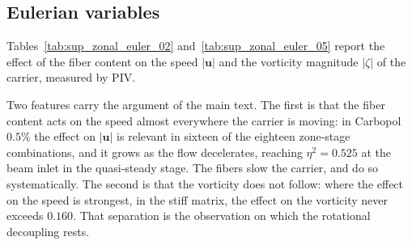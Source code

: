\documentclass[%
  aip,
  pof,
  reprint,
  floatfix
]{revtex4-2}
\begin{document}
\subsection{Eulerian variables}

Tables~\ref{tab:sup_zonal_euler_02} and~\ref{tab:sup_zonal_euler_05} report the effect of the fiber content on the speed $|\bm{u}|$ and the vorticity magnitude $|\zeta|$ of the carrier, measured by PIV.

Two features carry the argument of the main text. The first is that the fiber content acts on the speed almost everywhere the carrier is moving: in Carbopol $0.5\%$ the effect on $|\bm{u}|$ is relevant in sixteen of the eighteen zone-stage combinations, and it grows as the flow decelerates, reaching $\eta^2 = 0.525$ at the beam inlet in the quasi-steady stage. The fibers slow the carrier, and do so systematically. The second is that the vorticity does not follow: where the effect on the speed is strongest, in the stiff matrix, the effect on the vorticity never exceeds $0.160$. That separation is the observation on which the rotational decoupling rests.
\end{document}
